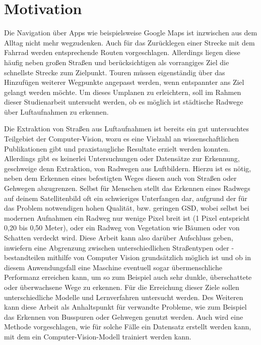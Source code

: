 \chapter{Motivation} \label{sec:motivation} \label{mot:ziele} \label{mot:strukt}

Die Navigation über Apps wie beispielsweise Google Maps ist inzwischen aus dem Alltag nicht mehr wegzudenken.
Auch für das Zurücklegen einer Strecke mit dem Fahrrad werden entsprechende Routen vorgeschlagen.
Allerdings liegen diese häufig neben großen Straßen und berücksichtigen als vorrangiges Ziel die schnellste Strecke zum Zielpunkt.
Touren müssen eigenständig über das Hinzufügen weiterer Wegpunkte angepasst werden, wenn entspannter ans Ziel gelangt werden möchte.
Um dieses Umplanen zu erleichtern, soll im Rahmen dieser Studienarbeit untersucht werden, ob es möglich ist 
städtische Radwege über Luftaufnahmen zu erkennen.

Die Extraktion von Straßen aus Luftaufnahmen ist bereits
ein gut untersuchtes Teilgebiet der Computer-Vision, wozu es eine Vielzahl an wissenschaftlichen Publikationen gibt
und praxistaugliche Resultate erzielt werden konnten. \\
Allerdings gibt es keinerlei Untersuchungen oder Datensätze zur Erkennung, geschweige denn Extraktion, 
von Radwegen aus Luftbildern. Hierzu ist es nötig, neben dem Erkennen eines befestigten Weges  
diesen auch von Straßen oder Gehwegen abzugrenzen. Selbst für 
Menschen stellt das Erkennen eines Radwegs auf deinem Satellitenbild oft ein schwieriges Unterfangen dar, 
aufgrund der für das Problem notwendigen hohen Qualität, bzw. geringen \ac{GSD}, wobei selbst bei modernen 
Aufnahmen ein Radweg nur wenige Pixel breit ist (1 Pixel entspricht 0,20 bis 0,50 Meter), oder ein Radweg von Vegetation wie Bäumen oder von Schatten verdeckt wird.
Diese Arbeit kann also darüber Aufschluss geben, inwiefern eine Abgrenzung zwischen unterschiedlichen Straßentypen oder -bestandteilen mithilfe von Computer Vision
grundsätzlich möglich ist und ob in diesem Anwendungsfall eine Maschine eventuell sogar übermenschliche Performanz 
erreichen kann, um so zum Beispiel auch sehr dunkle, überschattete oder überwachsene Wege zu erkennen. 
Für die Erreichung dieser Ziele sollen unterschiedliche Modelle und Lernverfahren untersucht werden. 
Des Weiteren kann diese Arbeit als Anhaltspunkt für verwandte Probleme, wie zum Beispiel das Erkennen von Busspuren 
oder Gehwegen genutzt werden. Auch wird eine Methode vorgeschlagen, wie für solche Fälle ein Datensatz erstellt werden 
kann, mit dem ein Computer-Vision-Modell trainiert werden kann. 



